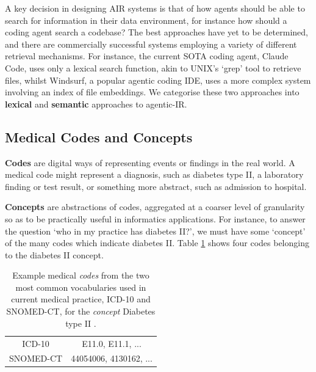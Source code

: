 \documentclass[11pt]{article}
\begin{document}
A key decision in designing AIR systems is that of how agents should be able to search for information in their data environment, for instance how should a coding agent search a codebase? The best approaches have yet to be determined, and there are commercially successful systems employing a variety of different retrieval mechanisms.
For instance, the current SOTA coding agent, Claude Code, uses only a lexical search function, akin to UNIX's `grep' tool to retrieve files, whilst Windsurf, a popular agentic coding IDE, uses a more complex system involving an index of file embeddings. We categorise these two approaches into \textbf{lexical} and \textbf{semantic} approaches to agentic-IR.

\subsection{Medical Codes and Concepts}

\textbf{Codes} are digital ways of representing events or findings in the real world. A medical code might represent a diagnosis, such as diabetes type II, a laboratory finding or test result, or something more abstract, such as admission to hospital.

\textbf{Concepts} are abstractions of codes, aggregated at a coarser level of granularity so as to be practically useful in informatics applications.
For instance, to answer the question `who in my practice has diabetes II?', we must have some `concept' of the many codes which indicate diabetes II. Table \ref{tab:concept-as-multi-vocab-codelist} shows four codes belonging to the diabetes II concept.


\begin{table}[h]
    \centering
    \begin{tabular}{|c|c|}
         \hline
         ICD-10 & E11.0, E11.1, ... \\
         SNOMED-CT & 44054006, 4130162, ...\\
         \hline
    \end{tabular}
    \caption{Example medical \textit{codes} from the two most common vocabularies used in current medical practice, ICD-10 and SNOMED-CT, for the \textit{concept} Diabetes type II \cite{world_health_organization_icd-10_2004, bhattacharyya_introduction_2015}.}
    \label{tab:concept-as-multi-vocab-codelist}
\end{table}
\end{document}
